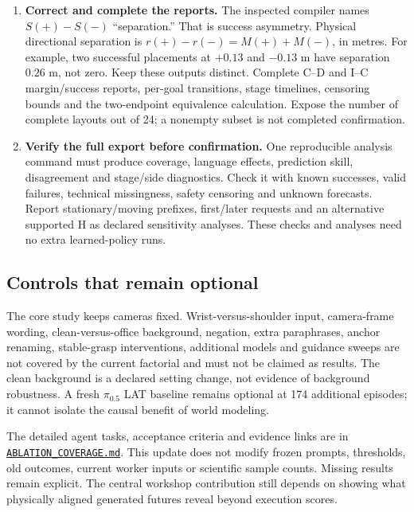 \begin{enumerate}[leftmargin=*]
\item \textbf{Correct and complete the reports.} The inspected compiler names $S(+)-S(-)$ ``separation.'' That is success asymmetry. Physical directional separation is $r(+)-r(-)=M(+)+M(-)$, in metres. For example, two successful placements at $+0.13$ and $-0.13$ m have separation $0.26$ m, not zero. Keep these outputs distinct. Complete C--D and I--C margin/success reports, per-goal transitions, stage timelines, censoring bounds and the two-endpoint equivalence calculation. Expose the number of complete layouts out of 24; a nonempty subset is not completed confirmation.
\item \textbf{Verify the full export before confirmation.} One reproducible analysis command must produce coverage, language effects, prediction skill, disagreement and stage/side diagnostics. Check it with known successes, valid failures, technical missingness, safety censoring and unknown forecasts. Report stationary/moving prefixes, first/later requests and an alternative supported H as declared sensitivity analyses. These checks and analyses need no extra learned-policy runs.
\end{enumerate}

\subsection{Controls that remain optional}
The core study keeps cameras fixed. Wrist-versus-shoulder input, camera-frame wording, clean-versus-office background, negation, extra paraphrases, anchor renaming, stable-grasp interventions, additional models and guidance sweeps are not covered by the current factorial and must not be claimed as results. The clean background is a declared setting change, not evidence of background robustness. A fresh $\pi_{0.5}$ LAT baseline remains optional at 174 additional episodes; it cannot isolate the causal benefit of world modeling.

The detailed agent tasks, acceptance criteria and evidence links are in
\href{https://github.com/adeeb10abbas/steerable/blob/scene-design-rtx-20260923/docs/scene_design_rtx/ABLATION_COVERAGE.md}{\texttt{ABLATION\_COVERAGE.md}}. This update does not modify frozen prompts, thresholds, old outcomes, current worker inputs or scientific sample counts. Missing results remain explicit. The central workshop contribution still depends on showing what physically aligned generated futures reveal beyond execution scores.
